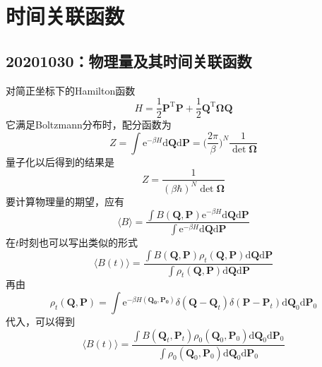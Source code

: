 \chapter{时间关联函数}
    \section{20201030：物理量及其时间关联函数}
    对简正坐标下的Hamilton函数
    \begin{equation*}
        H = \frac 12 \bm{P}^\mathrm{T}\bm{P} + \frac 12 \bm{Q}^\mathrm{T} \bm{\Omega Q}
    \end{equation*}
    它满足Boltzmann分布时，配分函数为
    \begin{equation*}
        Z = \int \mathrm{e}^{-\beta H} \mathrm{d}\bm{Q}\mathrm{d}\bm{P} = \bigg(\frac {2\pi}{\beta}\bigg)^N \frac 1{\det \bm{\Omega}}
    \end{equation*}
    量子化以后得到的结果是
    \begin{equation*}
        Z = \frac 1{(\beta \hbar)^N \det \bm{\Omega}}
    \end{equation*}
    要计算物理量的期望，应有
    \begin{equation*}
        \langle B \rangle = \frac {\int B(\bm{Q,P})\mathrm{e}^{-\beta H} \mathrm{d}\bm{Q}\mathrm{d}\bm{P}}{\int \mathrm{e}^{-\beta H} \mathrm{d}\bm{Q}\mathrm{d}\bm{P}}
    \end{equation*}
    在$t$时刻也可以写出类似的形式
    \begin{equation*}
        \langle B(t) \rangle = \frac {\int B(\bm{Q,P}) \rho_t(\bm{Q,P}) \mathrm{d}\bm{Q}\mathrm{d}\bm{P}}{\int \rho_t(\bm{Q,P}) \mathrm{d}\bm{Q}\mathrm{d}\bm{P}}
    \end{equation*}
    再由
    \begin{equation*}
        \rho_t (\bm{Q,P}) = \int \mathrm{e}^{-\beta H(\bm{Q_0,P_0})} \delta(\bm{Q-Q}_t) \delta(\bm{P-P}_t) \mathrm{d}\bm{Q}_0\mathrm{d}\bm{P}_0
    \end{equation*}
    代入，可以得到
    \begin{equation*}
        \langle B(t) \rangle = \frac {\int B(\bm{Q}_t,\bm{P}_t) \rho_0(\bm{Q}_0,\bm{P}_0) \mathrm{d}\bm{Q}_0\mathrm{d}\bm{P}_0}{\int \rho_0(\bm{Q}_0,\bm{P}_0) \mathrm{d}\bm{Q}_0\mathrm{d}\bm{P}_0}
    \end{equation*}

